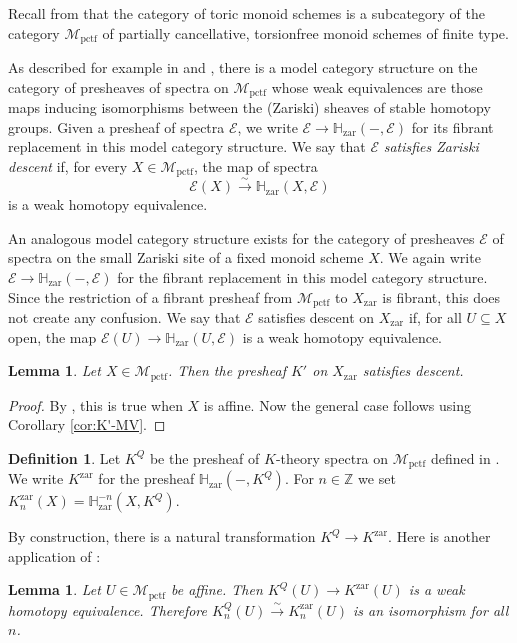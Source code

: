 \documentclass[12pt]{amsart}
\def\zar{{\mathrm{zar}}}
\def\cMpctf{{\mathcal M}_{\text{pctf}}}
\def\Kzar{K^{\mathrm{zar}}}
\def\KQ{K^Q}
\newcommand{\bbH}{\mathbb H}
\newcommand{\Z}{\mathbb{Z}}
\numberwithin{equation}{section}
\theoremstyle{plain}
\newtheorem{lem}[equation]{Lemma}
\theoremstyle{definition}
\newtheorem{defn}[equation]{Definition}
\theoremstyle{remark}
\begin{document}
Recall from \cite{CHWW-p} that  the category of toric monoid schemes is a subcategory of the category $\cMpctf$ of
partially cancellative, torsionfree monoid schemes of finite type. 

As described for example in \cite[Sec.\,12]{CHWW} and \cite[Sec.\,5]{CHWW-p}, there is a model category structure on the
category of presheaves of spectra on $\cMpctf$ whose weak equivalences are those maps inducing isomorphisms between the (Zariski) sheaves of stable homotopy groups. Given a presheaf of spectra $\mathcal{E}$, we write $\mathcal{E}\to\bbH_{\zar}(-, \mathcal{E})$ for its fibrant replacement in this model category structure. We say that $\mathcal{E}$ {\it satisfies Zariski descent} if, for every $X\in \cMpctf$, the map of spectra 
\[\mathcal{E}(X)\xrightarrow{\sim} \bbH_{\zar}(X, \mathcal{E})\] 
is a weak homotopy equivalence. 

An analogous model category structure exists for the category of presheaves $\mathcal{E}$ of spectra on the small Zariski site of a fixed monoid scheme $X$. We again write $\mathcal{E}\to \bbH_{\zar}(-, \mathcal{E})$ for the fibrant replacement in this model category structure. Since the restriction of a fibrant presheaf from $\cMpctf$ to $X_\zar$ is fibrant, this does not create any confusion. We say that $\mathcal{E}$ satisfies descent on $X_\zar$ if, for all $U\subseteq X$ open, the map $\mathcal{E}(U)\to \bbH_{\zar}(U, \mathcal{E})$ is a weak homotopy equivalence.

\begin{lem}\label{lem:K'-descent}
	Let $X\in\cMpctf$. Then the presheaf $K'$ on $X_\zar$ satisfies descent. 
\end{lem}

\begin{proof}
	By \cite[Lemma 5.2]{CHWW-p}, this is true when $X$ is affine. Now the general case follows using Corollary \ref{cor:K'-MV}.
\end{proof}
 

\begin{defn}\label{defn:K-Zar}
Let $\KQ$ be the presheaf of $K$-theory spectra on $\cMpctf$ 
defined in \cite[Section 3.4]{ELY}.
We write $\Kzar$ for the presheaf $\bbH_{\zar}(-, \KQ)$. For $n\in\Z$ we set
$\Kzar_n(X) = \bbH_{\zar}^{-n}(X, \KQ).$
\end{defn}

By construction, there is a natural transformation $\KQ\to \Kzar$.
Here is another application of \cite[Lemma 5.2]{CHWW-p}:

\begin{lem}\label{lem:affine-equivalence}
Let $U\in \cMpctf$ be affine. Then $\KQ(U)\rightarrow \Kzar (U)$
is a weak homotopy equivalence.
Therefore $\KQ_n(U)\xrightarrow{\sim} \Kzar_n(U)$
is an isomorphism for all $n$.
\end{lem}
\end{document}

